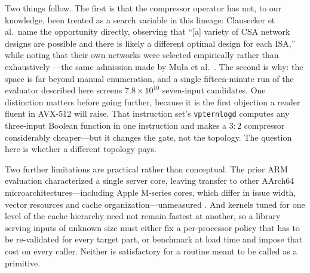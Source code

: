 \documentclass[fleqn,10pt]{wlscirep}
\begin{document}
Two things follow. The first is that the compressor operator has not, to our knowledge, been treated as a search variable in this lineage: Clausecker et al.\ name the opportunity directly, observing that ``[a] variety of CSA network designs are possible and there is likely a different optimal design for each ISA,'' while noting that their own networks were selected empirically rather than exhaustively \cite{clausecker2024}---the same admission made by Mu{\l}a et al.\ \cite{Mula2016}. The second is why: the space is far beyond manual enumeration, and a single fifteen-minute run of the evaluator described here screens $7.8\times10^{10}$ seven-input candidates. One distinction matters before going further, because it is the first objection a reader fluent in AVX-512 will raise. That instruction set's \texttt{vpternlogd} computes any three-input Boolean function in one instruction and makes a $3{:}2$ compressor considerably cheaper---but it changes the gate, not the topology. The question here is whether a different topology pays.

Two further limitations are practical rather than conceptual. The prior ARM evaluation characterized a single server core, leaving transfer to other AArch64 microarchitectures---including Apple M-series cores, which differ in issue width, vector resources and cache organization---unmeasured \cite{clausecker2024}. And kernels tuned for one level of the cache hierarchy need not remain fastest at another, so a library serving inputs of unknown size must either fix a per-processor policy that has to be re-validated for every target part, or benchmark at load time and impose that cost on every caller. Neither is satisfactory for a routine meant to be called as a primitive.
\end{document}
